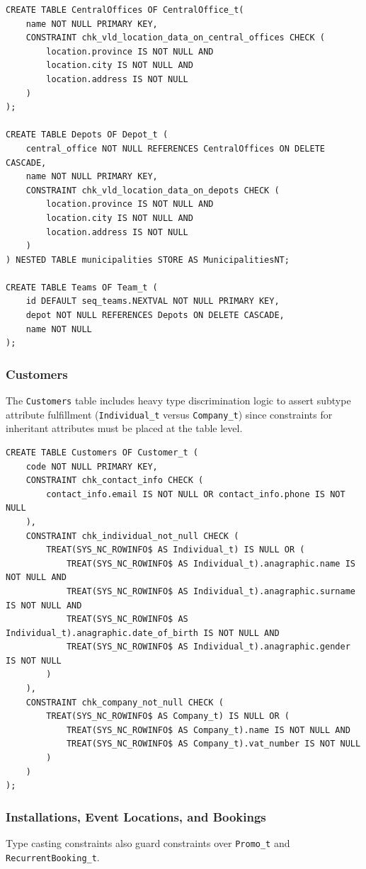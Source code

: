 \begin{verbatim}
CREATE TABLE CentralOffices OF CentralOffice_t(
    name NOT NULL PRIMARY KEY,
    CONSTRAINT chk_vld_location_data_on_central_offices CHECK (
        location.province IS NOT NULL AND
        location.city IS NOT NULL AND
        location.address IS NOT NULL
    )
);

CREATE TABLE Depots OF Depot_t (
    central_office NOT NULL REFERENCES CentralOffices ON DELETE CASCADE,
    name NOT NULL PRIMARY KEY,
    CONSTRAINT chk_vld_location_data_on_depots CHECK (
        location.province IS NOT NULL AND
        location.city IS NOT NULL AND
        location.address IS NOT NULL
    )
) NESTED TABLE municipalities STORE AS MunicipalitiesNT;

CREATE TABLE Teams OF Team_t (
    id DEFAULT seq_teams.NEXTVAL NOT NULL PRIMARY KEY,
    depot NOT NULL REFERENCES Depots ON DELETE CASCADE,
    name NOT NULL
);
\end{verbatim}

\subsubsection{Customers}
The \texttt{Customers} table includes heavy type discrimination logic to assert subtype attribute fulfillment (\texttt{Individual\_t} versus \texttt{Company\_t}) since constraints for inheritant attributes must be placed at the table level.

\begin{verbatim}
CREATE TABLE Customers OF Customer_t (
    code NOT NULL PRIMARY KEY,
    CONSTRAINT chk_contact_info CHECK (
        contact_info.email IS NOT NULL OR contact_info.phone IS NOT NULL
    ),
    CONSTRAINT chk_individual_not_null CHECK (
        TREAT(SYS_NC_ROWINFO$ AS Individual_t) IS NULL OR (
            TREAT(SYS_NC_ROWINFO$ AS Individual_t).anagraphic.name IS NOT NULL AND
            TREAT(SYS_NC_ROWINFO$ AS Individual_t).anagraphic.surname IS NOT NULL AND
            TREAT(SYS_NC_ROWINFO$ AS Individual_t).anagraphic.date_of_birth IS NOT NULL AND
            TREAT(SYS_NC_ROWINFO$ AS Individual_t).anagraphic.gender IS NOT NULL
        )
    ),
    CONSTRAINT chk_company_not_null CHECK (
        TREAT(SYS_NC_ROWINFO$ AS Company_t) IS NULL OR (
            TREAT(SYS_NC_ROWINFO$ AS Company_t).name IS NOT NULL AND
            TREAT(SYS_NC_ROWINFO$ AS Company_t).vat_number IS NOT NULL
        )
    )
);
\end{verbatim}

\subsubsection{Installations, Event Locations, and Bookings}
Type casting constraints also guard constraints over \texttt{Promo\_t} and \texttt{RecurrentBooking\_t}.

